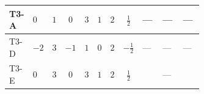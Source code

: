 \documentclass[8pt]{article}
\begin{document}
\begin{landscape}
\begin{longtable}{@{}llcccccc >{\raggedright\arraybackslash}p{0.21\linewidth} >{\raggedright\arraybackslash}p{0.21\linewidth} >{\raggedright\arraybackslash}p{0.21\linewidth}@{}}
\midrule
T3-A & $0$ & $1$ & $0$ & $3$ & $1$ & $2$ & $\frac{1}{2}$ & --- & --- & --- \\
\midrule
T3-D & $-2$ & $3$ & $-1$ & $1$ & $0$ & $2$ & $-\frac{1}{2}$ & --- & --- & --- \\
\midrule
T3-E & $0$ & $3$ & $0$ & $3$ & $1$ & $2$ & $\frac{1}{2}$ & \scriptsize\adjustbox{max width=\linewidth}{$\begin{gathered} -\frac{2}{9} {\lambda_{T3}} \left({\lambda_{T3}}\right)^{*}\end{gathered}$} & --- & \scriptsize\adjustbox{max width=\linewidth}{$\begin{gathered} -24 {g_2}^2 {\lambda_{12}^{\rm Adj}}\end{gathered}$} \\
\midrule
\bottomrule
\end{longtable}
\clearpage

\end{landscape}
\end{document}
